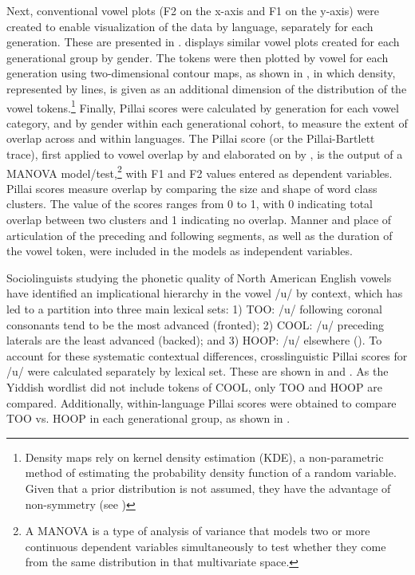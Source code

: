 \documentclass[output=paper]{langsci/langscibook}
\begin{document}
Next, conventional vowel plots (F2 on the x-axis and F1 on the y-axis) were created to enable visualization of the data by language, separately for each generation. These are presented in .  displays similar vowel plots created for each generational group by gender. The tokens were then plotted by vowel for each generation using two-dimensional contour maps, as shown in , in which density, represented by lines, is given as an additional dimension of the distribution of the vowel tokens.\footnote{Density maps rely on kernel density estimation (KDE), a non-parametric method of estimating the probability density function of a random variable. Given that a prior distribution is not assumed, they have the advantage of non-symmetry (see \citealt{NyczHall-Lew2013})} Finally, Pillai scores were calculated by generation for each vowel category, and by gender within each generational cohort, to measure the extent of overlap across and within languages. The Pillai score (or the Pillai-Bartlett trace), first applied to vowel overlap by \citet{HayEtAl2006} and elaborated on by \citet{NyczHall-Lew2013}, is the output of a MANOVA model/test,\footnote{A MANOVA is a type of analysis of variance that models two or more continuous dependent variables simultaneously to test whether they come from the same distribution in that multivariate space.} with F1 and F2 values entered as dependent variables. Pillai scores measure overlap by comparing the size and shape of word class clusters. The value of the scores ranges from 0 to 1, with 0 indicating total overlap between two clusters and 1 indicating no overlap. Manner and place of articulation of the preceding and following segments, as well as the duration of the vowel token, were included in the models as independent variables.

Sociolinguists studying the phonetic quality of North American English vowels have identified an implicational hierarchy in the vowel /u/ by context, which has led to a partition into three main lexical sets: 1) TOO: /u/ following coronal consonants tend to be the most advanced (fronted); 2) COOL: /u/ preceding laterals are the least advanced (backed); and 3) HOOP: /u/ elsewhere (\citealt{Hall-Lew2009, LabovEtAl2005, Baranowski2008}). To account for these systematic contextual differences, crosslinguistic Pillai scores for /u/ were calculated separately by lexical set. These are shown in  and . As the Yiddish wordlist did not include tokens of COOL, only TOO and HOOP are compared. Additionally, within-language Pillai scores were obtained to compare TOO vs. HOOP in each generational group, as shown in . 
\end{document}
